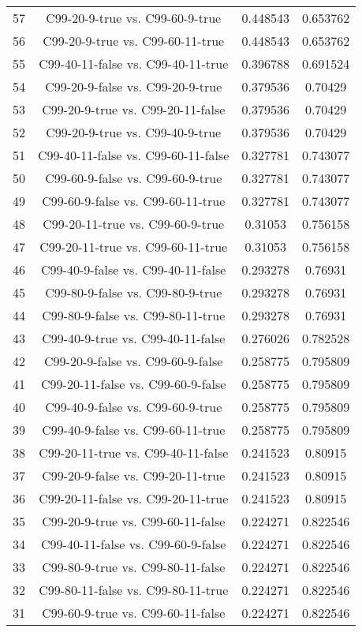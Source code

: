 \documentclass[a4paper,10pt]{article}
\begin{document}
\begin{landscape}
\begin{table}[!htp]
\begin{tabular}{cccc}
57&C99-20-9-true vs. C99-60-9-true&0.448543&0.653762\\
56&C99-20-9-true vs. C99-60-11-true&0.448543&0.653762\\
55&C99-40-11-false vs. C99-40-11-true&0.396788&0.691524\\
54&C99-20-9-false vs. C99-20-9-true&0.379536&0.70429\\
53&C99-20-9-true vs. C99-20-11-false&0.379536&0.70429\\
52&C99-20-9-true vs. C99-40-9-true&0.379536&0.70429\\
51&C99-40-11-false vs. C99-60-11-false&0.327781&0.743077\\
50&C99-60-9-false vs. C99-60-9-true&0.327781&0.743077\\
49&C99-60-9-false vs. C99-60-11-true&0.327781&0.743077\\
48&C99-20-11-true vs. C99-60-9-true&0.31053&0.756158\\
47&C99-20-11-true vs. C99-60-11-true&0.31053&0.756158\\
46&C99-40-9-false vs. C99-40-11-false&0.293278&0.76931\\
45&C99-80-9-false vs. C99-80-9-true&0.293278&0.76931\\
44&C99-80-9-false vs. C99-80-11-true&0.293278&0.76931\\
43&C99-40-9-true vs. C99-40-11-false&0.276026&0.782528\\
42&C99-20-9-false vs. C99-60-9-false&0.258775&0.795809\\
41&C99-20-11-false vs. C99-60-9-false&0.258775&0.795809\\
40&C99-40-9-false vs. C99-60-9-true&0.258775&0.795809\\
39&C99-40-9-false vs. C99-60-11-true&0.258775&0.795809\\
38&C99-20-11-true vs. C99-40-11-false&0.241523&0.80915\\
37&C99-20-9-false vs. C99-20-11-true&0.241523&0.80915\\
36&C99-20-11-false vs. C99-20-11-true&0.241523&0.80915\\
35&C99-20-9-true vs. C99-60-11-false&0.224271&0.822546\\
34&C99-40-11-false vs. C99-60-9-false&0.224271&0.822546\\
33&C99-80-9-true vs. C99-80-11-false&0.224271&0.822546\\
32&C99-80-11-false vs. C99-80-11-true&0.224271&0.822546\\
31&C99-60-9-true vs. C99-60-11-false&0.224271&0.822546\\

\end{tabular}
\end{table}
\end{landscape}
\end{document}
